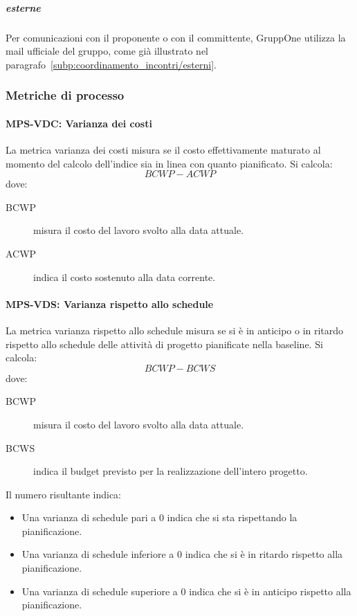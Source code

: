 \documentclass[../../norme-di-progetto.tex]{subfiles}
\begin{document}
\subparagraph{esterne}%
\label{subp:esterne}
Per comunicazioni con il proponente o con il committente, GruppOne utilizza la mail ufficiale del gruppo, come già illustrato nel paragrafo~\ref{subp:coordinamento_incontri/esterni}.


\subsubsection{Metriche di processo}%
\label{subs:gestione_del_personale/metriche_di_processo}

\paragraph{MPS-VDC: Varianza dei costi}%
\label{par:MPS-VDC_varianza_dei_costi}

La metrica varianza dei costi misura se il costo effettivamente maturato al momento del calcolo dell'indice sia in linea con quanto pianificato. Si calcola:
\[
  BCWP-ACWP
\]
dove:
\begin{description}
  \item [BCWP] misura il costo del lavoro svolto alla data attuale.
  \item [ACWP] indica il costo sostenuto alla data corrente.
\end{description}

\paragraph{MPS-VDS: Varianza rispetto allo schedule}%
\label{par:MPS-VDS_varianza_rispetto_allo_schedule}

La metrica varianza rispetto allo schedule misura se si è in anticipo o in ritardo rispetto allo schedule delle attività di progetto pianificate nella baseline. Si calcola:
\[
  BCWP - BCWS
\]
dove:
\begin{description}
  \item [BCWP] misura il costo del lavoro svolto alla data attuale.
  \item [BCWS] indica il budget previsto per la realizzazione dell'intero progetto.
\end{description}
Il numero risultante indica:
\begin{itemize}
  \item Una varianza di schedule pari a 0 indica che si sta rispettando la pianificazione.
  \item Una varianza di schedule inferiore a 0 indica che si è in ritardo rispetto alla pianificazione.
  \item Una varianza di schedule superiore a 0 indica che si è in anticipo rispetto alla pianificazione.
\end{itemize}
\end{document}
